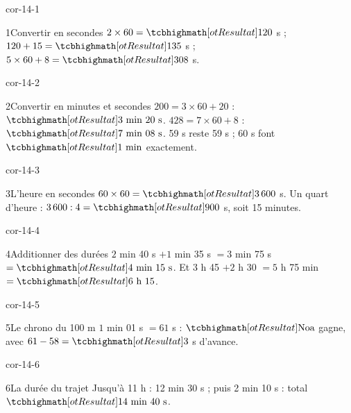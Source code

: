 \clearpage\pagestyle{otMain}\setlength{\otBlocEspacement}{2.5mm}\fontsize{11}{15}\selectfont{}
\begin{blocLivre}{cor-14-1}\begin{corrige}{1}{Convertir en secondes}
$2\times60=\res{120}$ s ; $120+15=\res{135}$ s ; $5\times60+8=\res{308}$ s.
\end{corrige}\end{blocLivre}
\begin{blocLivre}{cor-14-2}\begin{corrige}{2}{Convertir en minutes et secondes}
$200=3\times60+20$ : $\res{3\ \text{min}\ 20\ \text s}$. $428=7\times60+8$ : $\res{7\ \text{min}\ 08\ \text s}$. 59 s reste 59 s ; 60 s font $\res{1\ \text{min}}$ exactement.
\end{corrige}\end{blocLivre}
\begin{blocLivre}{cor-14-3}\begin{corrige}{3}{L’heure en secondes}
$60\times60=\res{3\,600}$ s. Un quart d’heure : $3\,600:4=\res{900}$ s, soit 15 minutes.
\end{corrige}\end{blocLivre}
\begin{blocLivre}{cor-14-4}\begin{corrige}{4}{Additionner des durées}
$2$ min 40 s $+1$ min 35 s $=3$ min 75 s $=\res{4\ \text{min}\ 15\ \text s}$. Et $3$ h 45 $+2$ h 30 $=5$ h 75 min $=\res{6\ \text h\ 15}$.
\end{corrige}\end{blocLivre}
\begin{blocLivre}{cor-14-5}\begin{corrige}{5}{Le chrono du 100 m}
$1$ min 01 s $=61$ s : $\res{\text{Noa}}$ gagne, avec $61-58=\res3$ s d’avance.
\end{corrige}\end{blocLivre}
\begin{blocLivre}{cor-14-6}\begin{corrige}{6}{La durée du trajet}
Jusqu’à 11 h : 12 min 30 s ; puis 2 min 10 s : total $\res{14\ \text{min}\ 40\ \text s}$.
\end{corrige}\end{blocLivre}
